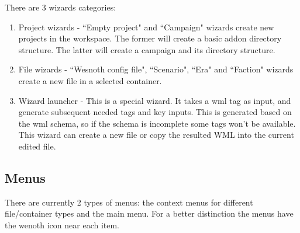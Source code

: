 \documentclass[10pt]{article}
\begin{document}
There are 3 wizards categories:
\begin{enumerate}
\item Project wizards - ``Empty project" and ``Campaign" wizards create new projects in the workspace. The former will create a basic addon directory structure. The latter will create a campaign and its directory structure.
\item File wizards - ``Wesnoth config file", ``Scenario", ``Era" and ``Faction" wizards create a new file in a selected container.
\item Wizard launcher - This is a special wizard. It takes a wml tag as input, and generate subsequent needed tags and key inputs. This is generated based on the wml schema, so if the schema is incomplete some tags won't be available. This wizard can create a new file or copy the resulted WML into the current edited file.
\end{enumerate}

\subsection{Menus}
There are currently 2 types of menus: the context menus for different file/container types and the main menu. For a better distinction the menus have the wenoth icon near each item.
\end{document}
